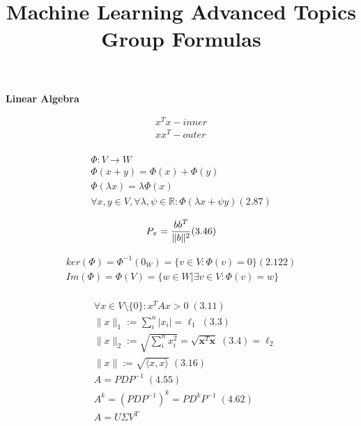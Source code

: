 \documentclass[fleqn]{article}
\date{} %
\title{Machine Learning Advanced Topics Group Formulas \vspace{-4em}}
\begin{document}
\maketitle



\begin{minipage}[t]{0.33\textwidth}

\textbf{Linear Algebra}

\begin{equation*}
\begin{split}
	x^Tx - inner\\
	xx^T - outer\\
\end{split}	
\end{equation*}

\begin{multline*}
\Phi: V \to W \\
\Phi(x+y) = \Phi(x) +  \Phi(y)\\
	\Phi(\lambda x) =  \lambda \Phi(x)\\
\forall x,y\in V, \forall \lambda, \psi \in \mathbb{R} : \Phi(\lambda x + \psi y) (2.87)
\end{multline*}

\begin{equation*}
P_\pi=\frac{bb^T}{\|b\|^2} (3.46) \\
\end{equation*}

\begin{multline}
ker(\Phi) = \Phi^{-1}(0_W) 
 = \{v\in V: \Phi(v) =0\} (2.122)\\
Im(\Phi) = \Phi(V) 
 =  \{w \in W | \exists v\in V: \Phi(v) = w \}\\
\end{multline}

\begin{equation*}
\begin{split}
&\forall x \in V\setminus\{0\}: x^TAx > 0\;(3.11)\\
&\|x\|_1 := \sum_i^n |x_i| =\ell_1 \;(3.3)\\
&\|x\|_2 := \sqrt{\sum_i^n x_i^2} = \sqrt{\textbf{x}^T \textbf{x}}\;(3.4) =\ell_2\\
&\|x\| := \sqrt{\langle x,x\rangle}\;(3.16)\\
&A = P D P^{-1}\;(4.55)\\
&A^k =(P D P^{-1})^k = P D^k P^{-1}\;(4.62)\\
&A = U\Sigma V^T\\
\end{split}	
\end{equation*}


\end{minipage}
\end{document}
